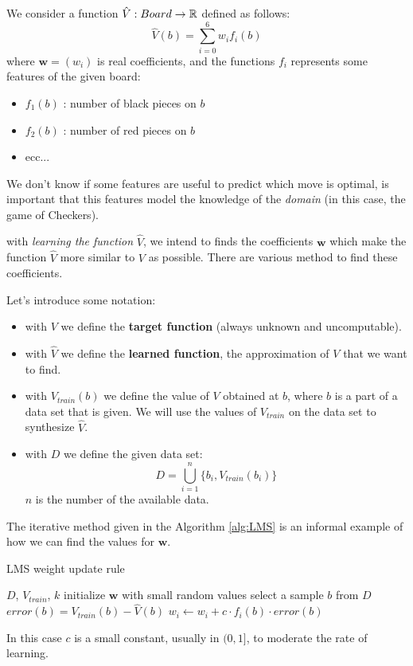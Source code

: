 \documentclass[10pt, letterpaper]{report}
\begin{document}
We consider a function $\hat V: Board\rightarrow{\mathbb R}$ defined as follows:\begin{equation}
    \hat V(b)=\sum_{i=0}^6w_if_i(b)
\end{equation}
where $\mathbf w = (w_i)$ is real coefficients, and the functions $f_i$ represents some features of the given board:\begin{itemize}
    \item $f_1(b)$ : number of black pieces on $b$
    \item $f_2(b)$ : number of red pieces on $b$
    \item ecc...
\end{itemize}
We don't know if some features are useful to predict which move is optimal, is important that this features model the knowledge of the \textit{domain} (in this case, the game of Checkers). \bigskip

with \textit{learning the function} $\hat V$, we intend to finds the coefficients $\mathbf w$ which make the function $\hat V$ more similar to $V$ as possible. There are various method to find these coefficients.\bigskip

Let's introduce some notation:\begin{itemize}
    \item with $V$ we  define the \textbf{target function} (always unknown and uncomputable).
    \item with $\hat V$ we  define the \textbf{learned function}, the approximation of $V$ that we want to find.
    \item with $V_{train}(b)$ we define the value of $V$ obtained at $b$, where $b$ is a part of a data set that is given. We will use the values of $V_{train}$ on the data set to synthesize $\hat V$.
    \item with $D$ we define the given data set:\begin{equation}
        D=\bigcup_{i=1}^n\{b_i,V_{train}(b_i)\}
    \end{equation}
    $n$ is the number of the available data.
\end{itemize}
The iterative method given in the Algorithm \ref{alg:LMS} is an informal example of how we can find the values for $\mathbf w$.
\begin{algorithm}
    \caption{LMS weight update rule}\label{alg:LMS}
    \begin{algorithmic}
    \Require $D$, $V_{train}$, $k$
    \State initialize $\mathbf w$ with small random values 
    \State select a sample $b$ from $D$
    \State $error(b)=V_{train}(b)-\hat V(b)$
    \State $w_i\leftarrow w_i+c\cdot f_i(b)\cdot error(b)$
    \EndFor
    \EndFor
    \end{algorithmic}
\end{algorithm}
In this case $c$ is a small constant, usually in $(0,1]$, to moderate the rate of learning.\bigskip
\end{document}
